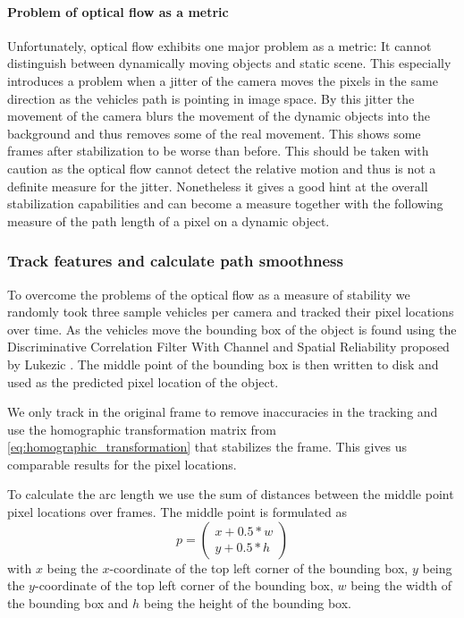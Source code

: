 \paragraph{Problem of optical flow as a metric}
\label{sec:dynamic_stabilization_evaluation_optical_flow_problem}
Unfortunately, optical flow exhibits one major problem as a metric: 
It cannot distinguish between dynamically moving objects and static scene.
This especially introduces a problem when a jitter of the camera moves the pixels in the same direction as the vehicles path is pointing in image space.
By this jitter the movement of the camera blurs the movement of the dynamic objects into the background and thus removes some of the real movement.
This shows some frames after stabilization to be worse than before. 
This should be taken with caution as the optical flow cannot detect the relative motion and thus is not a definite measure for the jitter.
Nonetheless it gives a good hint at the overall stabilization capabilities and can become a measure together with the following measure of the path length of a pixel on a dynamic object. 




\subsubsection{Track features and calculate path smoothness}
To overcome the problems of the optical flow as a measure of stability we randomly took three sample vehicles per camera and tracked their pixel locations over time.
As the vehicles move the bounding box of the object is found using the Discriminative Correlation Filter With Channel and Spatial Reliability proposed by Lukezic \etal{} \cite{Lukezic_2017_CVPR,opencv_library}.
The middle point of the bounding box is then written to disk and used as the predicted pixel location of the object.

We only track in the original frame to remove inaccuracies in the tracking and use the homographic transformation matrix from \autoref{eq:homographic_transformation} that stabilizes the frame.
This gives us comparable results for the pixel locations. 

To calculate the arc length we use the sum of distances between the middle point pixel locations over frames. 
The middle point is formulated as 
\begin{equation}
    p = \begin{pmatrix}
        x + 0.5 * w \\
        y + 0.5 * h
    \end{pmatrix}
\end{equation}
with $x$ being the $x$-coordinate of the top left corner of the bounding box, 
$y$ being the $y$-coordinate of the top left corner of the bounding box, 
$w$ being the width of the bounding box and
$h$ being the height of the bounding box.

